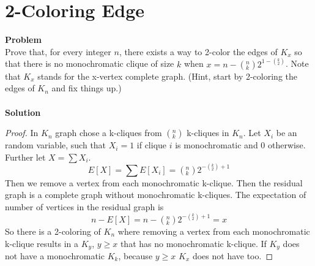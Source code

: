 	\section{2-Coloring Edge}
	\textbf{Problem}\\
	Prove that, for every integer $n$, there exists a way to 2-color the edges of $K_x$ so that there is no monochromatic clique of size $k$ when $x = n - ({}_k^n) 2^{1-({}_2^k)}$. Note that $K_x$ stands for the x-vertex complete graph. (Hint, start by 2-coloring the edges of $K_n$ and fix things up.)\\\\
	\textbf{Solution}\\
	\begin{proof}
		In $K_n$ graph chose a k-cliques from $({}_k^n)$ k-cliques in $K_n$. Let $X_i$ be an random variable, such that $X_i=1$ if clique $i$ is monochromatic and 0 otherwise. Further let $X=\sum X_i$.\\
	\begin{equation*}
		E[X] = \sum E[X_i] = ({}_k^n) 2^{-({}_2^k)+1}
	\end{equation*}
	Then we remove a vertex from each monochromatic k-clique. Then the residual graph is a complete graph without monochromatic k-cliques. The expectation of number of vertices in the residual graph is
	\begin{equation*}
		n-E[X] = n - ({}_k^n) 2^{-({}_2^k)+1} = x
	\end{equation*}
	So there is a 2-coloring of $K_n$ where removing a vertex from each monochromatic k-clique results in a $K_y$, $y\ge x$ that has no monochromatic k-clique. If $K_y$ does not have a monochromatic $K_k$, because $y \ge x$ $K_x$ does not have too.
	\end{proof}
	
